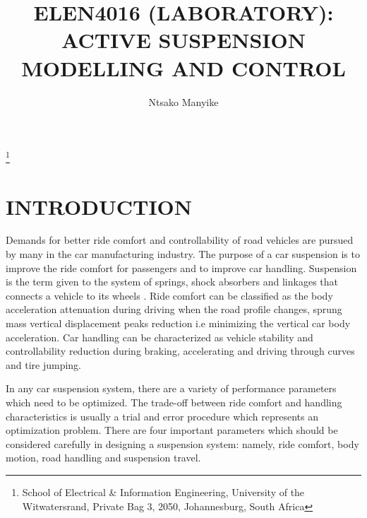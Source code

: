 \documentclass[10pt,twocolumn]{witseiepaper}
\begin{document}
\title{ELEN4016 (LABORATORY): ACTIVE SUSPENSION MODELLING AND CONTROL}

\author{Ntsako Manyike}

\thanks{School of Electrical \& Information Engineering, University of the
Witwatersrand, Private Bag 3, 2050, Johannesburg, South Africa}



%



\maketitle
\thispagestyle{empty}\pagestyle{empty}


%
\section{INTRODUCTION}

Demands for better ride comfort and controllability of road vehicles are pursued by many in the car manufacturing industry. The purpose of a car suspension is to improve the ride comfort for passengers and to improve car handling. Suspension is the term given to the system of springs, shock absorbers and linkages that connects a vehicle to its wheels \cite{Ghita:2008}. Ride comfort can be classified as the body acceleration attenuation during driving when the road profile changes, sprung mass vertical displacement peaks reduction i.e minimizing the vertical car body acceleration. Car handling can be characterized as vehicle stability and controllability reduction during braking, accelerating and driving through curves and tire jumping.

In any car suspension system, there are a variety of performance parameters which need to be optimized. The trade-off between ride comfort and handling characteristics is usually a trial and error procedure which represents an optimization problem. There are four important parameters which should be considered carefully in designing a suspension system: namely, ride comfort, body motion, road handling and suspension travel.
\end{document}
